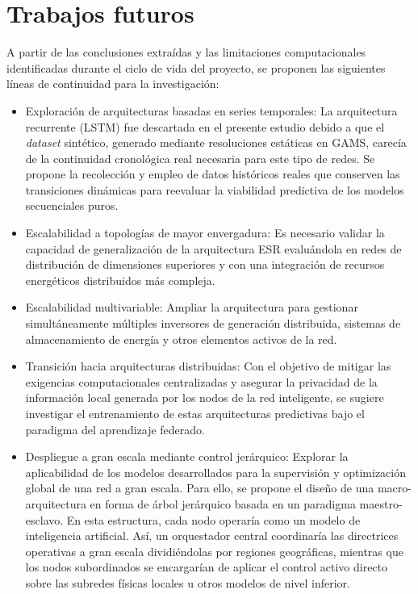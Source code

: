\section{Trabajos futuros}
A partir de las conclusiones extraídas y las limitaciones computacionales identificadas durante el ciclo de vida del proyecto, se proponen las siguientes líneas de continuidad para la investigación:
\begin{itemize}
	\item Exploración de arquitecturas basadas en series temporales: La arquitectura recurrente (LSTM) fue descartada en el presente estudio debido a que el \textit{dataset} sintético, generado mediante resoluciones estáticas en GAMS, carecía de la continuidad cronológica real necesaria para este tipo de redes. Se propone la recolección y empleo de datos históricos reales que conserven las transiciones dinámicas para reevaluar la viabilidad predictiva de los modelos secuenciales puros.
	
	\item Escalabilidad a topologías de mayor envergadura: Es necesario validar la capacidad de generalización de la arquitectura ESR evaluándola en redes de distribución de dimensiones superiores y con una integración de recursos energéticos distribuidos más compleja.
	
	\item Escalabilidad multivariable: Ampliar la arquitectura para gestionar simultáneamente múltiples inversores de generación distribuida, sistemas de almacenamiento de energía y otros elementos activos de la red.
	
	\item Transición hacia arquitecturas distribuidas: Con el objetivo de mitigar las exigencias computacionales centralizadas y asegurar la privacidad de la información local generada por los nodos de la red inteligente, se sugiere investigar el entrenamiento de estas arquitecturas predictivas bajo el paradigma del aprendizaje federado.
	
	\item Despliegue a gran escala mediante control jerárquico: Explorar la aplicabilidad de los modelos desarrollados para la supervisión y optimización global de una red a gran escala. Para ello, se propone el diseño de una macro-arquitectura en forma de árbol jerárquico basada en un paradigma maestro-esclavo. En esta estructura, cada nodo operaría como un modelo de inteligencia artificial. Así, un orquestador central coordinaría las directrices operativas a gran escala dividiéndolas por regiones geográficas, mientras que los nodos subordinados se encargarían de aplicar el control activo directo sobre las subredes físicas locales u otros modelos de nivel inferior.
\end{itemize}